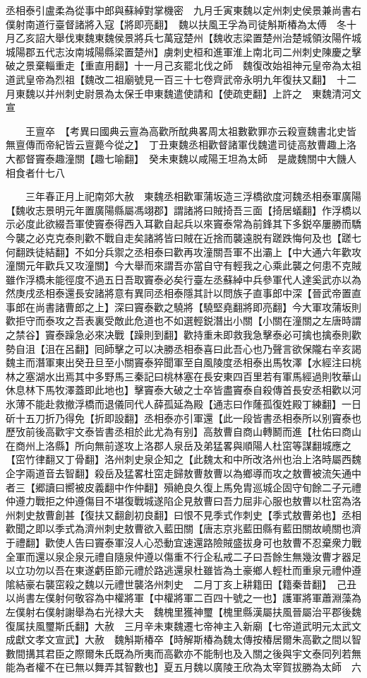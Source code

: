 丞相泰引盧柔為從事中郎與蘇綽對掌機密　九月壬寅東魏以定州刺史侯景兼尚書右僕射南道行臺督諸將入寇【將即亮翻】　魏以扶風王孚為司徒斛斯椿為太傅　冬十月乙亥詔大舉伐東魏東魏侯景將兵七萬寇楚州【魏收志梁置楚州治楚城領汝陽仵城城陽郡五代志汝南城陽縣梁置楚州】虜刺史桓和進軍淮上南北司二州刺史陳慶之擊破之景棄輜重走【重直用翻】十一月己亥罷北伐之師　魏復改始祖神元皇帝為太祖道武皇帝為烈祖【魏改二祖廟號見一百三十七卷齊武帝永明九年復扶又翻】　十二月東魏以并州刺史尉景為太保壬申東魏遣使請和【使疏吏翻】上許之　東魏清河文宣

　　王亶卒　【考異曰國典云亶為高歡所酖典畧周太祖數歡罪亦云殺亶魏書北史皆無亶傳而帝紀皆云亶薨今從之】　丁丑東魏丞相歡督諸軍伐魏遣司徒高敖曹趣上洛大都督竇泰趣潼關【趣七喻翻】　癸未東魏以咸陽王坦為太師　是歲魏關中大饑人相食者什七八

　　三年春正月上祀南郊大赦　東魏丞相歡軍蒲坂造三浮橋欲度河魏丞相泰軍廣陽【魏收志景明元年置廣陽縣屬馮翊郡】謂諸將曰賊掎吾三面【掎居蟻翻】作浮橋以示必度此欲綴吾軍使竇泰得西入耳歡自起兵以來竇泰常為前鋒其下多鋭卒屢勝而驕今襲之必克克泰則歡不戰自走矣諸將皆曰賊在近捨而襲遠脱有蹉跌悔何及也【蹉七何翻跌徒結翻】不如分兵禦之丞相泰曰歡再攻潼關吾軍不出灞上【中大通六年歡攻潼關元年歡兵又攻潼關】今大舉而來謂吾亦當自守有輕我之心乘此襲之何患不克賊雖作浮橋未能徑度不過五日吾取竇泰必矣行臺左丞蘇綽中兵參軍代人達奚武亦以為然庚戌丞相泰還長安諸將意有異同丞相泰隱其計以問族子直事郎中深【晉武帝置直事郎在尚書諸曹郎之上】深曰竇泰歡之驍將【驍堅堯翻將即亮翻】今大軍攻蒲坂則歡拒守而泰攻之吾表裏受敵此危道也不如選輕鋭潛出小關【小關在潼關之左唐時謂之禁谷】竇泰躁急必來决戰【躁則到翻】歡持重未即救我急擊泰必可擒也擒泰則歡勢自沮【沮在呂翻】囘師擊之可以决勝丞相泰喜曰此吾心也乃聲言欲保隴右辛亥謁魏主而潛軍東出癸丑旦至小關竇泰猝聞軍至自風陵度丞相泰出馬牧澤【水經注曰桃林之塞湖水出焉其中多野馬三秦記曰桃林塞在長安東四百里若有軍馬經過則牧華山休息林下馬牧澤蓋即此地也】擊竇泰大破之士卒皆盡竇泰自殺傳首長安丞相歡以河氷薄不能赴救撤浮橋而退儀同代人薛孤延為殿【通志曰作蕯孤復姓殿丁練翻】一日斫十五刀折乃得免【折即設翻】丞相泰亦引軍還【此一段皆書丞相泰所以别竇泰也歷攷前後高歡宇文泰皆書丞相於此尤為有别】高敖曹自商山轉鬭而進【杜佑曰商山在商州上洛縣】所向無前遂攻上洛郡人泉岳及弟猛畧與順陽人杜窋等謀翻城應之【窋竹律翻又丁骨翻】洛州刺史泉企知之【此魏太和中所改洛州也治上洛時屬西魏企字兩道音去智翻】殺岳及猛畧杜窋走歸敖曹敖曹以為鄉導而攻之敖曹被流矢通中者三【郷讀曰嚮被皮義翻中作仲翻】殞絶良久復上馬免胄巡城企固守旬餘二子元禮仲遵力戰拒之仲遵傷目不堪復戰城遂陷企見敖曹曰吾力屈非心服也敖曹以杜窋為洛州刺史敖曹創甚【復扶又翻創初良翻】曰恨不見季式作刺史【季式敖曹弟也】丞相歡聞之即以季式為濟州刺史敖曹欲入藍田關【唐志京兆藍田縣有藍田關故嶢關也濟于禮翻】歡使人告曰竇泰軍沒人心恐動宜速還路險賊盛拔身可也敖曹不忍棄衆力戰全軍而還以泉企泉元禮自隨泉仲遵以傷重不行企私戒二子曰吾餘生無幾汝曹才器足以立功勿以吾在東遂虧臣節元禮於路逃還泉杜雖皆為土豪鄉人輕杜而重泉元禮仲遵隂結豪右襲窋殺之魏以元禮世襲洛州刺史　二月丁亥上耕籍田【籍秦昔翻】　己丑以尚書左僕射何敬容為中權將軍【中權將軍二百四十號之一也】護軍將軍蕭淵藻為左僕射右僕射謝舉為右光禄大夫　魏槐里獲神璽【槐里縣漢屬扶風晉屬治平郡後魏復属扶風璽斯氏翻】大赦　三月辛未東魏遷七帝神主入新廟【七帝道武明元太武文成獻文孝文宣武】大赦　魏斛斯椿卒【時解斯椿為魏太傳按椿居爾朱高歡之間以智數間搆其君臣之際爾朱氏既為所夷而高歡亦不能制也及入關之後與宇文泰同列若無能為者權不在已無以舞弄其智數也】夏五月魏以廣陵王欣為太宰賀拔勝為太師　六

